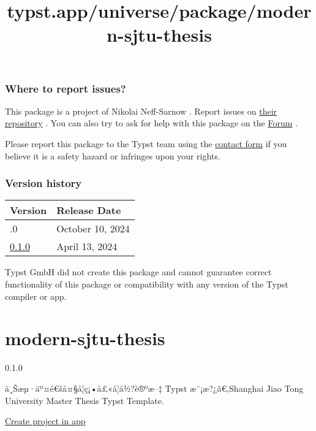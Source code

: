 \subsubsection{Where to report issues?}\label{where-to-report-issues}

This package is a project of Nikolai Neff-Sarnow . Report issues on
\href{https://github.com/nineff/grayness}{their repository} . You can
also try to ask for help with this package on the
\href{https://forum.typst.app}{Forum} .

Please report this package to the Typst team using the
\href{https://typst.app/contact}{contact form} if you believe it is a
safety hazard or infringes upon your rights.

\label{versions}
\subsubsection{Version history}\label{version-history}

\begin{longtable}[]{@{}ll@{}}
\toprule\noalign{}
Version & Release Date \\
\midrule\noalign{}
\endhead
\bottomrule\noalign{}
\endlastfoot
0.2.0 & October 10, 2024 \\
\href{https://typst.app/universe/package/grayness/0.1.0/}{0.1.0} & April
13, 2024 \\
\end{longtable}

Typst GmbH did not create this package and cannot guarantee correct
functionality of this package or compatibility with any version of the
Typst compiler or app.


\title{typst.app/universe/package/modern-sjtu-thesis}

\label{banner}
\label{template-thumbnail}

\section{modern-sjtu-thesis}\label{modern-sjtu-thesis}

{ 0.1.0 }

ä¸Šæµ·äº¤é€šå¤§å­¦ç¡•å£«å­¦ä½?è®ºæ--‡ Typst æ¨¡æ?¿ã€‚Shanghai Jiao Tong
University Master Thesis Typst Template.

\href{/app?template=modern-sjtu-thesis&version=0.1.0}{Create project in
app}

